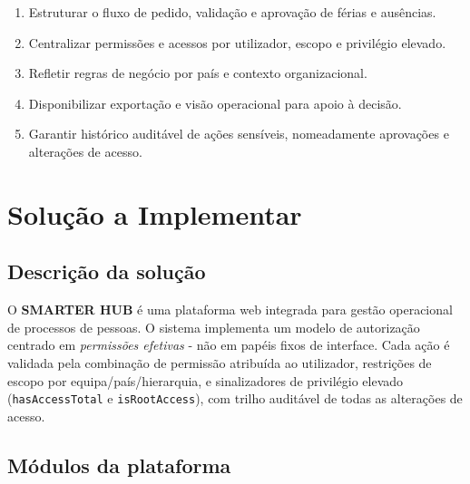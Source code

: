 \documentclass[11pt,a4paper,twoside]{article}
\begin{document}
\begin{enumerate}
  \item Estruturar o fluxo de pedido, validação e aprovação de férias e ausências.
  \item Centralizar permissões e acessos por utilizador, escopo e privilégio elevado.
  \item Refletir regras de negócio por país e contexto organizacional.
  \item Disponibilizar exportação e visão operacional para apoio à decisão.
  \item Garantir histórico auditável de ações sensíveis, nomeadamente aprovações e alterações de acesso.
\end{enumerate}

\section{Solução a Implementar}

\subsection{Descrição da solução}

O \textbf{SMARTER HUB} é uma plataforma web integrada para gestão operacional de processos de pessoas. O sistema implementa um modelo de autorização centrado em \emph{permissões efetivas} - não em papéis fixos de interface. Cada ação é validada pela combinação de permissão atribuída ao utilizador, restrições de escopo por equipa/país/hierarquia, e sinalizadores de privilégio elevado (\texttt{hasAccessTotal} e \texttt{isRootAccess}), com trilho auditável de todas as alterações de acesso.

\subsection{Módulos da plataforma}
\end{document}
